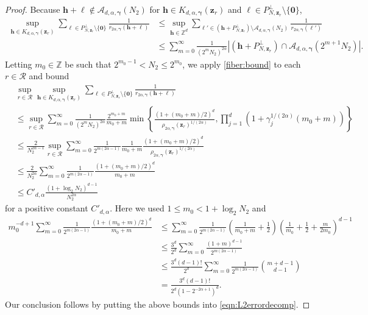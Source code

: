 \documentclass[10pt,a4paper]{amsart}
\newcommand{\Acal}{\mathcal{A}}
\newcommand{\ZZ}{\mathbb{Z}}
\newcommand{\bsgamma}{\boldsymbol{\gamma}}
\newcommand{\bsh}{\boldsymbol{h}}
\newcommand{\bsl}{\boldsymbol{\ell}}
\newcommand{\bsz}{\boldsymbol{z}}
\newcommand{\bszero}{\boldsymbol{0}}
\begin{document}
\begin{proof}
    Because $\bsh+\bsl\notin \Acal_{d,\alpha,\bsgamma}(N_2)$ for $\bsh\in K_{d,\alpha,\bsgamma}(\bsz_r)$ and $\bsl\in P^\perp_{N,\bsz_r}\setminus\{\bszero\}$,
 \begin{align*}
    \sup_{\bsh\in K_{d,\alpha,\bsgamma}(\bsz_r)} \sum_{\bsl\in P^\perp_{N,\bsz_r}\setminus\{\bszero\} }\frac{1}{r_{2\alpha,\bsgamma}(\bsh+\bsl)} & \leq \sup_{\bsh\in \ZZ^d} \sum_{\bsl'\in (\bsh+ P^\perp_{N,\bsz_r})\setminus \Acal_{d,\alpha,\bsgamma}(N_2)}\frac{1}{r_{2\alpha,\bsgamma}(\bsl')} \\
    & \leq  \sum_{m=0}^\infty \frac{1}{(2^m N_{2})^{2\alpha} } |(\bsh+ P^\perp_{N,\bsz_r})\cap \Acal_{d,\alpha,\bsgamma}(2^{m+1}N_{2})|.    
    \end{align*}
Letting $m_0 \in \mathbb{Z}$ be such that $2^{m_0-1} < N_2 \le 2^{m_0}$, we apply \eqref{fiber:bound} to each $r\in \mathcal{R}$ and bound
   \begin{align}\label{ineq_min}
       & \sup_{r\in \mathcal{R} } \sup_{\bsh \in K_{d,\alpha,\bsgamma}(\bsz_r)} \sum_{\bsl\in P^\perp_{N,\bsz_r}\setminus\{\bszero\} }\frac{1}{r_{2\alpha,\bsgamma}(\bsh+\bsl)} \nonumber \\
       & \leq \sup_{r \in \mathcal{R}} \sum_{m=0}^\infty \frac{1}{(2^m N_{2})^{2\alpha} }   \frac{2^{m_0+m}}{m_0+m} \min \left\{ \frac{(1 + (m_0+m) /2)^d}{\rho_{2 \alpha, \bsgamma}(\bm{z}_r )^{1/(2\alpha) }}, \prod_{j=1}^d (1 + \gamma_j^{1/(2\alpha) } (m_0+m) )  \right\} \nonumber \\ 
       & \leq \frac{2}{N_2^{2\alpha-1}} \sup_{r \in \mathcal{R}} \sum_{m=0}^\infty \frac{1}{ 2^{m (2\alpha-1)}  }   \frac{1}{m_0+m}  \frac{(1 + (m_0+m) /2)^d}{\rho_{2 \alpha, \bsgamma}(\bm{z}_r )^{1/(2\alpha) }}  \\
       & \leq \frac{2}{N_2^{2\alpha}} \sum_{m=0}^\infty \frac{1}{ 2^{m (2\alpha-1)}  }     \frac{(1 + (m_0+m) /2)^d}{ m_0 + m } \nonumber \\
       & \leq C'_{d, \alpha} \frac{ (1+\log_2 N_2)^{d-1}}{N_2^{2 \alpha }} \nonumber
 \end{align}
 for a positive constant $C'_{d, \alpha}$.
  Here we used $1\leq m_0 < 1 +  \log_2 N_2$ and
 \begin{align*}
 m_0^{-d+1} \sum_{m=0}^\infty \frac{1}{ 2^{m (2\alpha-1)}  } \frac{ ( 1 + (m_0+m)/2)^d}{m_0+m} & \leq \sum_{m=0}^\infty \frac{1}{ 2^{m (2\alpha-1)}  } \left(\frac{1}{m_0+m} + \frac{1}{2} \right) \left( \frac{1}{m_0} + \frac{1}{2}+ \frac{m}{2 m_0} \right)^{d-1} \\ 
 & \leq \frac{3^d}{2^d}\sum_{m=0}^\infty \frac{ (1 + m)^{d-1}}{ 2^{m (2\alpha-1)}  }   \\
 & \leq \frac{3^d(d-1)!}{2^d}  \sum_{m=0}^\infty \frac{1}{ 2^{m (2\alpha-1)}  }\binom{m+d-1}{d-1} \\ 
 & = \frac{ 3^d (d-1)! }{2^d(1- 2^{-2\alpha+1})^d}. 
 \end{align*}
 Our conclusion follows by putting the above bounds into \eqref{eqn:L2errordecomp}.
\end{proof}
\end{document}
